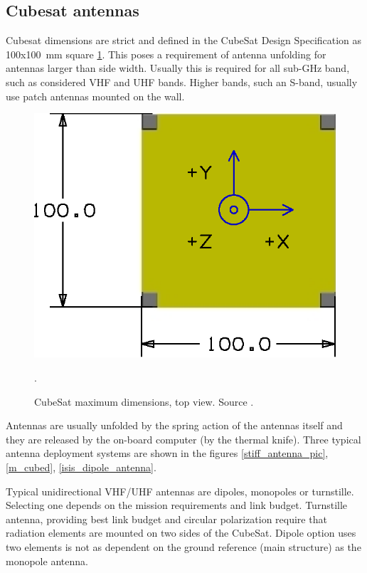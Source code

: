 \subsection{Cubesat antennas}
Cubesat dimensions are strict and defined in the CubeSat Design Specification \cite{cubesat_spec} as \si{100}x\si{100}~mm square \ref{CubeSat_max_dim}. This poses a requirement of antenna unfolding for antennas larger than side width. Usually this is required for all sub-GHz band, such as considered VHF and UHF bands. Higher bands, such an S-band, usually use patch antennas mounted on the wall.

\begin{figure}[H]
    \centering
    \includegraphics[width=0.5\paperwidth]{img/2/cubesat_dimensions.eps}
    \caption{CubeSat maximum dimensions, top view. Source \cite{cubesat_spec}.}.
    \label{CubeSat_max_dim}
\end{figure}

Antennas are usually unfolded by the spring action of the antennas itself and they are released by the on-board computer (by the thermal knife). Three typical antenna deployment systems are shown in the figures \ref{stiff_antenna_pic}, \ref{m_cubed}, \ref{isis_dipole_antenna}.

Typical unidirectional VHF/UHF antennas are dipoles, monopoles or turnstille. Selecting one depends on the mission requirements and link budget. Turnstille antenna, providing best link budget and circular polarization require that radiation elements are mounted on two sides of the CubeSat. Dipole option uses two elements is not as dependent on the ground reference (main structure) as the monopole antenna.

